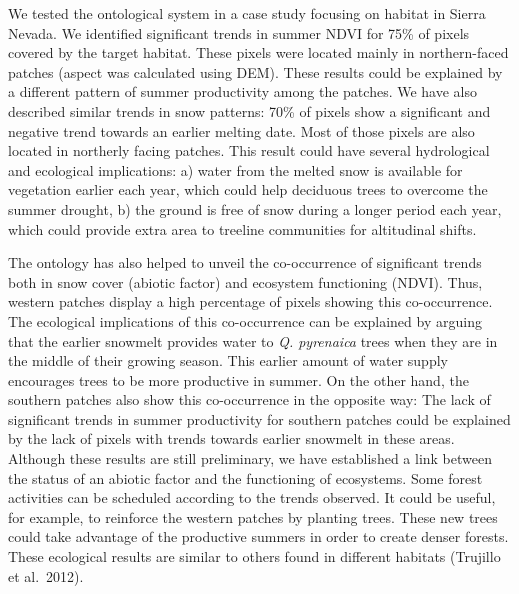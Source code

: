 We tested the ontological system in a case study focusing on \Qp habitat in Sierra Nevada. We identified significant trends in summer NDVI for 75\% of pixels covered by the target habitat. These pixels were located mainly in northern-faced patches (aspect was calculated using DEM). These results could be explained by a different pattern of summer productivity among the \Qp patches. We have also described similar trends in snow patterns: 70\% of pixels show a significant and negative trend towards an earlier melting date. Most of those pixels are also located in northerly facing patches. This result could have several hydrological and ecological implications: a) water from the melted snow is available for vegetation earlier each year, which could help deciduous trees to overcome the summer drought, b) the ground is free of snow during a longer period each year, which could provide extra area to treeline communities for altitudinal shifts.

The ontology has also helped to unveil the co-occurrence of significant trends both in snow cover (abiotic factor) and ecosystem functioning (NDVI). Thus, western patches display a high percentage of pixels showing this co-occurrence. The ecological implications of this co-occurrence can be explained by arguing that the earlier snowmelt provides water to \emph{Q. pyrenaica }trees when they are in the middle of their growing season. This earlier amount of water supply encourages trees to be more productive in summer. On the other hand, the southern patches also show this co-occurrence in the opposite way: The lack of significant trends in summer productivity for southern patches could be explained by the lack of pixels with trends towards earlier snowmelt in these areas. Although these results are still preliminary, we have established a link between the status of an abiotic factor and the functioning of ecosystems. Some forest activities can be scheduled according to the trends observed. It could be useful, for example, to reinforce the western patches by planting \Qp trees. These new trees could take advantage of the productive summers in order to create denser forests. These ecological results are similar to others found in different habitats (Trujillo et al.~2012).

